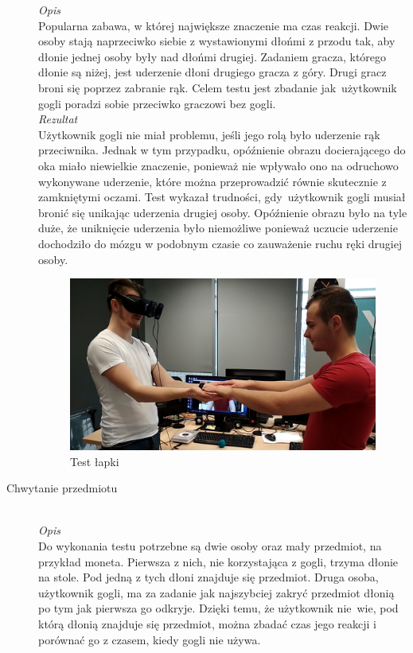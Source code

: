 \documentclass[a4paper,11pt,twoside]{report}
\theoremstyle{definition}
\begin{document}
\begin{description}
\textit{Opis} \\
Popularna zabawa, w której największe znaczenie ma czas reakcji. Dwie osoby stają naprzeciwko siebie z wystawionymi dłońmi z przodu tak, aby dłonie jednej osoby były nad dłońmi drugiej. Zadaniem gracza, którego dłonie są niżej, jest uderzenie dłoni drugiego gracza z góry. Drugi gracz broni się poprzez zabranie rąk. Celem testu jest zbadanie jak~użytkownik gogli poradzi sobie przeciwko graczowi bez gogli. \\

\textit{Rezultat}\\
Użytkownik gogli nie miał problemu, jeśli jego rolą było uderzenie rąk przeciwnika. Jednak w tym przypadku, opóźnienie obrazu docierającego do oka miało niewielkie znaczenie, ponieważ nie wpływało ono na odruchowo wykonywane uderzenie, które można przeprowadzić równie skutecznie z zamkniętymi oczami. Test wykazał trudności, gdy~użytkownik gogli musiał bronić się unikając uderzenia drugiej osoby. Opóźnienie obrazu było na tyle duże, że uniknięcie uderzenia było niemożliwe ponieważ uczucie uderzenie dochodziło do mózgu w podobnym czasie co zauważenie ruchu ręki drugiej osoby.

\begin{figure}[H]
\centering
\includegraphics[scale=0.25]{images/lapkiTest}
\caption[LapkiTest]{Test łapki}
\end{figure}


\item[Chwytanie przedmiotu] \hfill \\
\textit{Opis} \\
Do wykonania testu potrzebne są dwie osoby oraz mały przedmiot, na przykład moneta. Pierwsza z nich, nie korzystająca z gogli, trzyma dłonie na stole. Pod jedną z tych dłoni znajduje się przedmiot. Druga osoba, użytkownik gogli, ma za zadanie jak najszybciej zakryć przedmiot dłonią po tym jak pierwsza go odkryje. Dzięki temu, że użytkownik nie~wie, pod którą dłonią znajduje się przedmiot, można zbadać czas jego reakcji i porównać go z czasem, kiedy gogli nie używa. \\


\end{description}
\end{document}
